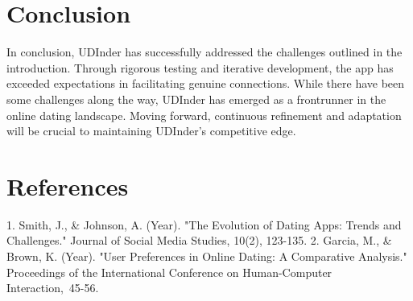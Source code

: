 \documentclass[final]{beamer}
\begin{document}
\begin{poster}
\vspace{1em}
\section{Conclusion}
\justifying
In conclusion, UDInder has successfully addressed the challenges outlined in the introduction. Through rigorous testing and iterative development, the app has exceeded expectations in facilitating genuine connections. While there have been some challenges along the way, UDInder has emerged as a frontrunner in the online dating landscape. Moving forward, continuous refinement and adaptation will be crucial to maintaining UDInder's competitive edge.




\section{References}
1. Smith, J., & Johnson, A. (Year). "The Evolution of Dating Apps: Trends and Challenges." Journal of Social Media Studies, 10(2), 123-135.
2. Garcia, M., & Brown, K. (Year). "User Preferences in Online Dating: A Comparative Analysis." Proceedings of the International Conference on Human-Computer Interaction, 45-56.
\printbibliography[heading=none]

\end{poster}
\end{document}
